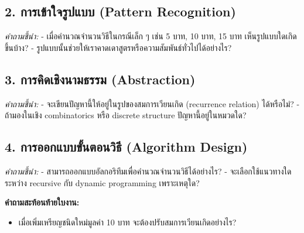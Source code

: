 \vspace{6em}


\subsection*{2. การเข้าใจรูปแบบ (Pattern Recognition)}
\textit{คำถามชี้นำ:}  
- เมื่อคำนวณจำนวนวิธีในกรณีเล็ก ๆ เช่น 5 บาท, 10 บาท, 15 บาท เห็นรูปแบบใดเกิดขึ้นบ้าง?  
- รูปแบบนั้นช่วยให้เราคาดเดาสูตรหรือความสัมพันธ์ทั่วไปได้อย่างไร?

\vspace{6em}


\subsection*{3. การคิดเชิงนามธรรม (Abstraction)}
\textit{คำถามชี้นำ:}  
- จะเขียนปัญหานี้ให้อยู่ในรูปของสมการเวียนเกิด (recurrence relation) ได้หรือไม่?  
- ถ้ามองในเชิง combinatorics หรือ discrete structure ปัญหานี้อยู่ในหมวดใด?

\vspace{6em}


\subsection*{4. การออกแบบขั้นตอนวิธี (Algorithm Design)}
\textit{คำถามชี้นำ:}  
- สามารถออกแบบอัลกอริทึมเพื่อคำนวณจำนวนวิธีได้อย่างไร?  
- จะเลือกใช้แนวทางใดระหว่าง recursive กับ dynamic programming เพราะเหตุใด?

\vspace{6em}


\noindent\textbf{คำถามสะท้อนท้ายใบงาน:}
\begin{itemize}
	\item เมื่อเพิ่มเหรียญชนิดใหม่มูลค่า 10 บาท จะต้องปรับสมการเวียนเกิดอย่างไร?  
\end{itemize}

\vspace{6em}



